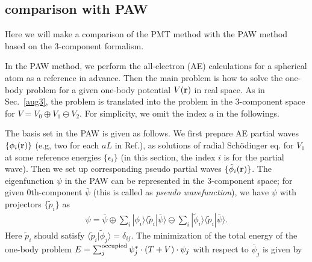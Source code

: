 \documentclass[twocolumn,showpacs,preprintnumbers,amsmath,amssymb,floatfix]{revtex4-1}
\newcommand{\bfr}{{\bf r}}
\newcommand{\refsec}[1]{\mbox{Sec.~\!\ref{#1}}}
\begin{document}
\subsection{comparison with PAW}
\label{sec:comparison}
Here we will make a comparison of the PMT method with the PAW method
\cite{PAW,kresse99} based on the 3-component formalism.

In the PAW method, we perform the all-electron (AE) 
calculations for a spherical atom as a reference in advance.
Then the main problem is how to solve the one-body problem
for a given one-body potential $V(\bfr)$ in real space. 
As in \refsec{aug3}, the problem is translated into the problem in the 3-component space
for $V=V_0\oplus V_1 \ominus V_2$.
For simplicity, we omit the index $a$ in the followings.

The basis set in the PAW is given as follows.
We first prepare AE partial waves
$\{\phi_i(\bfr)\}$ (e.g, two for each $aL$ in Ref.\cite{kresse99}),
as solutions of radial Sch\"odinger eq. for $V_1$ at some reference 
energies $\{\epsilon_i\}$ (in this section, the index $i$ is for the
partial wave). Then we set up corresponding
pseudo partial waves $\{\tilde{\phi}_i(\bfr)\}$.
The eigenfunction $\psi$ in the PAW can be represented 
in the 3-component space; for given 0th-component $\bar{\psi}$
(this is called as {\it pseudo wavefunction}), we have
$\psi$ with projectors $\{\tilde{p}_i\}$ as
\begin{eqnarray}
\psi=\bar{\psi}
\oplus \sum_i |\phi_i\rangle \langle \tilde{p}_i|\bar{\psi}\rangle
\ominus \sum_i |\tilde{\phi}_i \rangle \langle
\tilde{p}_i|\bar{\psi}\rangle.
\label{eq:psibar}
\end{eqnarray}
Here $\tilde{p}_i$ should satisfy
$\langle \tilde{p}_i|\tilde{\phi}_j \rangle=\delta_{ij}$.
The minimization of the total energy of the one-body problem 
$E= \sum_j^{\rm occupied} \psi_j^* \cdot (T+V) \cdot \psi_j$
with respect to $\bar{\psi}_j$ is given by
\end{document}
